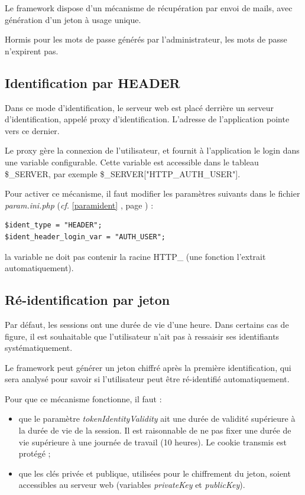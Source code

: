 Le framework dispose d'un mécanisme de récupération par envoi de mails, avec génération d'un jeton à usage unique.

Hormis pour les mots de passe générés par l'administrateur, les mots de passe n'expirent pas.

\subsection{Identification par HEADER}

Dans ce mode d'identification, le serveur web est placé derrière un serveur d'identification, appelé proxy d'identification. L'adresse de l'application pointe vers ce dernier. 

Le proxy gère la connexion de l'utilisateur, et fournit à l'application le login dans une variable configurable. Cette variable est accessible dans le tableau \$\_SERVER, par exemple \$\_SERVER["HTTP\_AUTH\_USER"].

Pour activer ce mécanisme, il faut modifier les paramètres suivants dans le fichier \textit{param.ini.php} (\textit{cf.} \ref{paramident} \textit{}, page \pageref{paramident}) :
\begin{lstlisting}
$ident_type = "HEADER";
$ident_header_login_var = "AUTH_USER";
\end{lstlisting}

la variable ne doit pas contenir la racine HTTP\_ (une fonction l'extrait automatiquement).

\subsection{Ré-identification par jeton}

Par défaut, les sessions ont une durée de vie d'une heure. Dans certains cas de figure, il est souhaitable que l'utilisateur n'ait pas à ressaisir ses identifiants systématiquement.

Le framework peut générer un jeton chiffré après la première identification, qui sera analysé pour savoir si l'utilisateur peut être ré-identifié automatiquement.

Pour que ce mécanisme fonctionne, il faut :
\begin{itemize}
\item que le paramètre \textit{tokenIdentityValidity} ait une durée de validité supérieure à la durée de vie de la session. Il est raisonnable de ne pas fixer une durée de vie supérieure à une journée de travail (10 heures). Le cookie transmis est protégé ;
\item que les clés privée et publique, utilisées pour le chiffrement du jeton, soient accessibles au serveur web (variables \textit{privateKey} et \textit{publicKey}).
\end{itemize}

